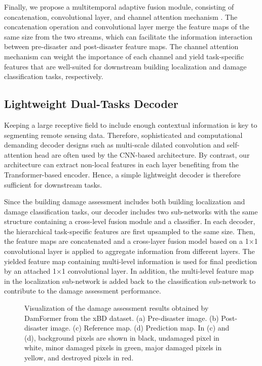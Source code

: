 \documentclass{article}
\begin{document}
\par Finally, we propose a multitemporal adaptive fusion module, consisting of concatenation, convolutional layer, and channel attention mechanism \cite{woo2018cbam}. The concatenation operation and convolutional layer merge the feature maps of the same size from the two streams, which can facilitate the information interaction between pre-disaster and post-disaster feature maps. The channel attention mechanism can weight the importance of each channel and yield task-specific features that are well-suited for downstream building localization and damage classification tasks, respectively.

\subsection{Lightweight Dual-Tasks Decoder}\label{sec:2.2}
\par Keeping a large receptive field to include enough contextual information is key to segmenting remote sensing data. Therefore, sophisticated and computational demanding decoder designs such as multi-scale dilated convolution and self-attention head are often used by the CNN-based architecture. By contrast, our architecture can extract non-local features in each layer benefiting from the Transformer-based encoder. Hence, a simple lightweight decoder is therefore sufficient for downstream tasks.

\par Since the building damage assessment includes both building localization and damage classification tasks, our decoder includes two sub-networks with the same structure containing a cross-level fusion module and a classifier. In each decoder, the hierarchical task-specific features  are first upsampled to the same size. Then, the feature maps are concatenated and a cross-layer fusion model based on 
a 1$\times$1 convolutional layer is applied to aggregate information from different layers. The yielded feature map containing multi-level information is used for final prediction by an attached 1$\times$1 convolutional layer. In addition, the multi-level feature map in the localization sub-network is added back to the classification sub-network to contribute to the damage assessment performance. 
\begin{figure}[t]
  \centering
  \hfil
  \hfil
  \hfil
  \caption{Visualization of the damage assessment results obtained by DamFormer from the xBD dataset. (a) Pre-disaster image. (b) Post-disaster image. (c) Reference map. (d) Prediction map. In (c) and (d), background pixels are shown in black, undamaged pixel in white, minor damaged pixels in green, major damaged pixels in yellow, and destroyed pixels in red.}
  \label{fig:2}
\end{figure}
\end{document}
